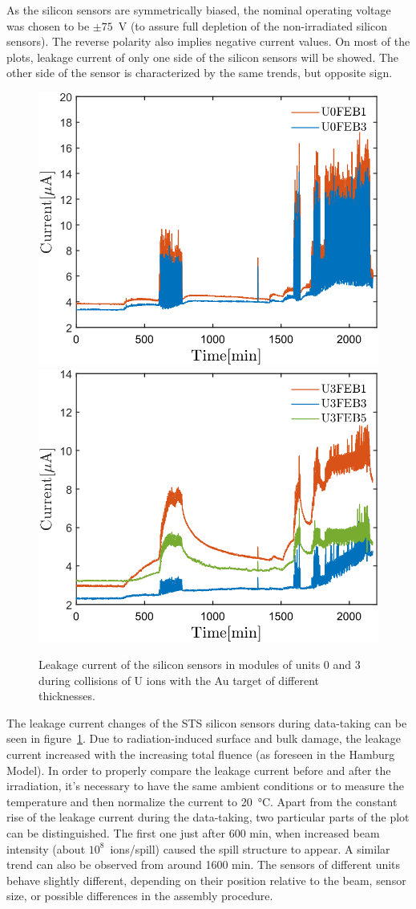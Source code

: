 As the silicon sensors are symmetrically biased, the nominal operating voltage was chosen to be $\pm75$~V (to assure full depletion of the non-irradiated silicon sensors). The reverse polarity also implies negative current values. On most of the plots, leakage current of only one side of the silicon sensors will be showed. The other side of the sensor is characterized by the same trends, but opposite sign.

\begin{figure}[!h]
\centering
\includegraphics[width=0.45\columnwidth]{Chapter6/DCS/images/uranium/U0.png}
\includegraphics[width=0.45\columnwidth]{Chapter6/DCS/images/uranium/U3.png}
\caption{Leakage current of the silicon sensors in modules of units 0 and 3 during collisions of U ions with the Au target of different thicknesses.}
\label{fig_msts_LC}
\end{figure}

The leakage current changes of the \gls{STS} silicon sensors during data-taking can be seen in figure~\ref{fig_msts_LC}. Due to radiation-induced surface and bulk damage, the leakage current  increased with the increasing total fluence (as foreseen in the Hamburg Model). In order to properly compare the leakage current before and after the irradiation, it's necessary to have the same ambient conditions or to measure the temperature and then normalize the current to \SI{20}{\celsius}. Apart from the constant rise of the leakage current during the data-taking, two particular parts of the plot can be distinguished. The first one just after 600 min, when increased beam intensity (about $10^{8}$~ions/spill) caused the spill structure to appear. A similar trend can also be observed from around 1600 min. The sensors of different units behave slightly different, depending on their position relative to the beam, sensor size, or possible differences in the assembly procedure.


